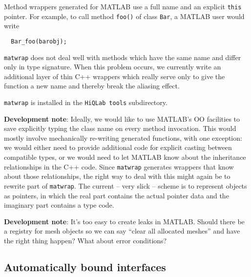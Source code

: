 \documentclass{article}
\newcommand{\hiq}{\texttt{HiQLab}}
\newcommand{\devnote}[1]{%
  \begin{trivlist}
  \item\textbf{Development note}: #1
  \end{trivlist}}
\newcommand{\ttt}[1]{\texttt{#1}}
\begin{document}
Method wrappers generated for MATLAB use a full name and an explicit
\ttt{this} pointer.  For example, to call method \ttt{foo()} of
class \ttt{Bar}, a MATLAB user would write
\begin{verbatim}
  Bar_foo(barobj);
\end{verbatim}
\ttt{matwrap} does not deal well with methods which have the
same name and differ only in type signature.  When this problem
occurs, we currently write an additional layer of thin C++ wrappers
which really serve only to give the function a new name and thereby
break the aliasing effect.

\ttt{matwrap} is installed in the \hiq\ \ttt{tools} subdirectory.

\devnote{Ideally, we would like to use MATLAB's OO facilities to save
  explicitly typing the class name on every method invocation.  This
  would mostly involve mechanically re-writing generated functions,
  with one exception: we would either need to provide additional code
  for explicit casting between compatible types, or we would need to
  let MATLAB know about the inheritance relationships in the C++
  code.  Since \ttt{matwrap} generates wrappers that know about
  those relationships, the right way to deal with this might again be
  to rewrite part of \ttt{matwrap}.  The current -- very slick --
  scheme is to represent objects as pointers, in which the real part
  contains the actual pointer data and the imaginary part contains a
  type code.}

\devnote{It's too easy to create leaks in MATLAB.  Should there be a
  registry for mesh objects so we can say ``clear all allocated
  meshes'' and have the right thing happen?  What about error conditions?}


\subsection{Automatically bound interfaces}
\end{document}
